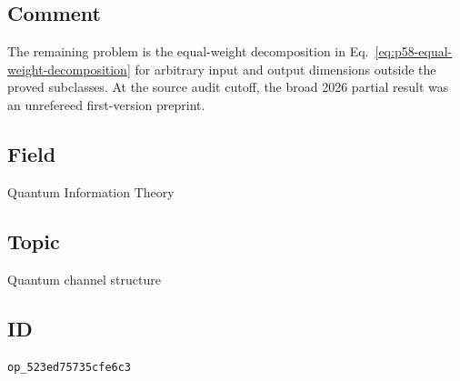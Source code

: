 \subsection*{Comment}

The remaining problem is the equal-weight decomposition in
Eq.~\eqref{eq:p58-equal-weight-decomposition} for arbitrary input and output
dimensions outside the proved subclasses.  At the source audit cutoff, the
broad 2026 partial result was an unrefereed first-version preprint.

\subsection*{Field}

Quantum Information Theory

\subsection*{Topic}

Quantum channel structure

\subsection*{ID}

\texttt{op\_523ed75735cfe6c3}
